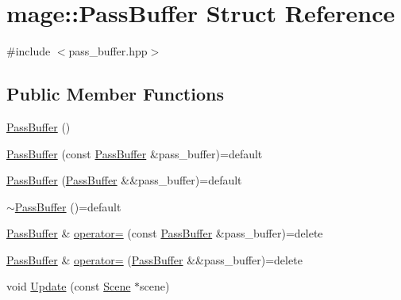 \hypertarget{structmage_1_1_pass_buffer}{}\section{mage\+:\+:Pass\+Buffer Struct Reference}
\label{structmage_1_1_pass_buffer}


{\ttfamily \#include $<$pass\+\_\+buffer.\+hpp$>$}

\subsection*{Public Member Functions}
\begin{DoxyCompactItemize}
\item 
\hyperlink{structmage_1_1_pass_buffer_a02e07a26327f6e57b193521636bb8e10}{Pass\+Buffer} ()
\item 
\hyperlink{structmage_1_1_pass_buffer_a1c6e779725227ebbb8e3d15a4515edbc}{Pass\+Buffer} (const \hyperlink{structmage_1_1_pass_buffer}{Pass\+Buffer} \&pass\+\_\+buffer)=default
\item 
\hyperlink{structmage_1_1_pass_buffer_a8f6baa279c6dc8c5b6869240d0169677}{Pass\+Buffer} (\hyperlink{structmage_1_1_pass_buffer}{Pass\+Buffer} \&\&pass\+\_\+buffer)=default
\item 
\hyperlink{structmage_1_1_pass_buffer_a650dec579522b7d5c5810a535b10773a}{$\sim$\+Pass\+Buffer} ()=default
\item 
\hyperlink{structmage_1_1_pass_buffer}{Pass\+Buffer} \& \hyperlink{structmage_1_1_pass_buffer_a8d0cc48dea7dfb6b710b6162b3a82b7e}{operator=} (const \hyperlink{structmage_1_1_pass_buffer}{Pass\+Buffer} \&pass\+\_\+buffer)=delete
\item 
\hyperlink{structmage_1_1_pass_buffer}{Pass\+Buffer} \& \hyperlink{structmage_1_1_pass_buffer_a8a5832066c415bea077107c7a9d18df5}{operator=} (\hyperlink{structmage_1_1_pass_buffer}{Pass\+Buffer} \&\&pass\+\_\+buffer)=delete
\item 
void \hyperlink{structmage_1_1_pass_buffer_a6b73eb28fac15b121ff013b03ab643f8}{Update} (const \hyperlink{classmage_1_1_scene}{Scene} $\ast$scene)
\end{DoxyCompactItemize}
